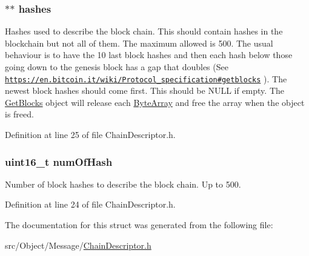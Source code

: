\hypertarget{struct_chain_descriptor_accd2c3f99c875e8657d976fc264c7fc6}{
\subsubsection[{hashes}]{$\ast$$\ast$ {\bf hashes}}}
\label{struct_chain_descriptor_accd2c3f99c875e8657d976fc264c7fc6}
Hashes used to describe the block chain. This should contain hashes in the blockchain but not all of them. The maximum allowed is 500. The usual behaviour is to have the 10 last block hashes and then each hash below those going down to the genesis block has a gap that doubles (See \href{https://en.bitcoin.it/wiki/Protocol_specification#getblocks}{\tt https://en.bitcoin.it/wiki/Protocol\_\-specification\#getblocks} ). The newest block hashes should come first. This should be NULL if empty. The \hyperlink{struct_get_blocks}{GetBlocks} object will release each \hyperlink{struct_byte_array}{ByteArray} and free the array when the object is freed. 

Definition at line 25 of file ChainDescriptor.h.

\hypertarget{struct_chain_descriptor_a2a73cb6d678dd0457074398eb7c27584}{
\subsubsection[{numOfHash}]{\setlength{\rightskip}{0pt plus 5cm}uint16\_\-t {\bf numOfHash}}}
\label{struct_chain_descriptor_a2a73cb6d678dd0457074398eb7c27584}
Number of block hashes to describe the block chain. Up to 500. 

Definition at line 24 of file ChainDescriptor.h.



The documentation for this struct was generated from the following file:\begin{DoxyCompactItemize}
\item 
src/Object/Message/\hyperlink{_chain_descriptor_8h}{ChainDescriptor.h}\end{DoxyCompactItemize}
